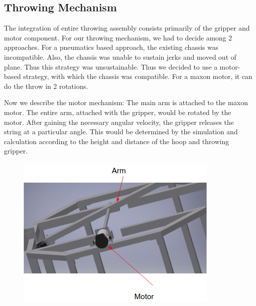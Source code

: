 \documentclass[11pt]{article}
\begin{document}
\subsection{Throwing Mechanism}
The integration of entire throwing assembly consists primarily of the gripper and motor component. For our throwing mechanism, we had to decide among 2 approaches. For a pneumatics based approach, the existing chassis was incompatible. Also, the chassis was unable to sustain jerks and moved out of plane. Thus this strategy was unsustainable. Thus we decided to use a motor-based strategy, with which the chassis was compatible. For a maxon motor, it can do the throw in 2 rotations.

Now we describe the motor mechanism: 
The main arm is attached to the maxon motor. The entire arm,  attached with the gripper, would be rotated by the motor.
After gaining the necessary angular velocity, the gripper releases the string at a particular angle. This would be determined by the simulation and calculation according to the height and distance of the hoop and throwing gripper.

\begin{figure}[!htb]
\centering
\includegraphics[scale=0.8]{thrower.png}
\end{figure}
\end{document}
